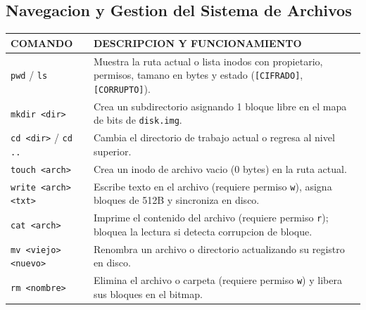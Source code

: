 \documentclass[11pt,a4paper]{article}
\begin{document}
	\subsection{Navegacion y Gestion del Sistema de Archivos}
	\begin{tabularx}{\textwidth}{|l|X|}
		\hline
		\rowcolor{bordergreen} \color{matrixgreen}\textbf{COMANDO} & \color{matrixgreen}\textbf{DESCRIPCION Y FUNCIONAMIENTO} \\
		\hline
		\rowcolor{termcard} \texttt{pwd} / \texttt{ls} & Muestra la ruta actual o lista inodos con propietario, permisos, tamano en bytes y estado (\texttt{[CIFRADO]}, \texttt{[CORRUPTO]}). \\
		\hline
		\rowcolor{bgblack}  \texttt{mkdir <dir>} & Crea un subdirectorio asignando 1 bloque libre en el mapa de bits de \texttt{disk.img}. \\
		\hline
		\rowcolor{termcard} \texttt{cd <dir>} / \texttt{cd ..} & Cambia el directorio de trabajo actual o regresa al nivel superior. \\
		\hline
		\rowcolor{bgblack}  \texttt{touch <arch>} & Crea un inodo de archivo vacio (0 bytes) en la ruta actual. \\
		\hline
		\rowcolor{termcard} \texttt{write <arch> <txt>} & Escribe texto en el archivo (requiere permiso \texttt{w}), asigna bloques de 512B y sincroniza en disco. \\
		\hline
		\rowcolor{bgblack}  \texttt{cat <arch>} & Imprime el contenido del archivo (requiere permiso \texttt{r}); bloquea la lectura si detecta corrupcion de bloque. \\
		\hline
		\rowcolor{termcard} \texttt{mv <viejo> <nuevo>} & Renombra un archivo o directorio actualizando su registro en disco. \\
		\hline
		\rowcolor{bgblack}  \texttt{rm <nombre>} & Elimina el archivo o carpeta (requiere permiso \texttt{w}) y libera sus bloques en el bitmap. \\
		\hline
	\end{tabularx}
	
\end{document}
